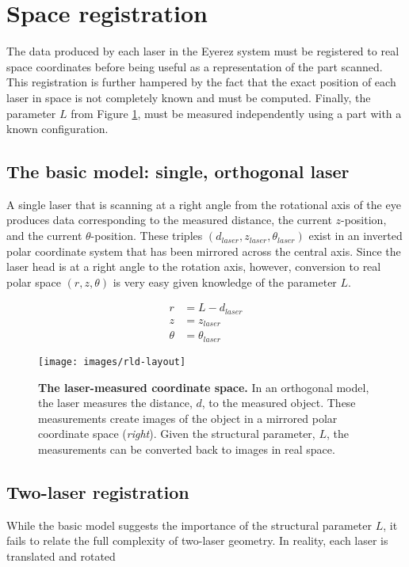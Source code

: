 
\section{Space registration}
\label{sec:space-registration}

The data produced by each laser in the Eyerez system must be
registered to real space coordinates before being useful as a
representation of the part scanned. This registration is further
hampered by the fact that the exact position of each laser in space is
not completely known and must be computed. Finally, the parameter $L$
from Figure \ref{fig:ideal-laser-geometry}, must be measured
independently using a part with a known configuration.

\subsection{The basic model: single, orthogonal laser}
\label{sec:basic-model:orthogonal}

A single laser that is scanning at a right angle from the rotational
axis of the eye produces data corresponding to the measured distance,
the current $z$-position, and the current $\theta$-position. These
triples $(d_{laser}, z_{laser}, \theta_{laser})$ exist in an inverted
polar coordinate system that has been mirrored across the central
axis. Since the laser head is at a right angle to the rotation axis,
however, conversion to real polar space $(r, z, \theta)$ is very easy
given knowledge of the parameter $L$.

\begin{align}
  r &= L - d_{laser} \\
  z &= z_{laser} \\
  \theta &= \theta_{laser}
\end{align}

\begin{figure}
  \texttt{[image: images/rld-layout]}
  \caption{\textbf{The laser-measured coordinate space.} In an
    orthogonal model, the laser measures the distance, $d$, to the
    measured object. These measurements create images of the object in
    a mirrored polar coordinate space (\textit{right}). Given the
    structural parameter, $L$, the measurements can be converted back
    to images in real space.}
  \label{fig:ideal-laser-geometry}
\end{figure}

\subsection{Two-laser registration}
\label{sec:two-laser-registr}

While the basic model suggests the importance of the structural
parameter $L$, it fails to relate the full complexity of two-laser
geometry. In reality, each laser is translated and rotated



